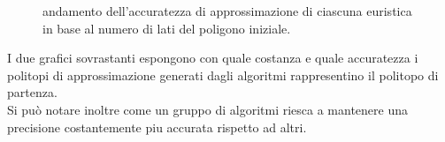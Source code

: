 \begin{figure}[H]
\begin{minipage}[b]{0.45\textwidth}
        \caption{andamento dell'accuratezza di approssimazione di ciascuna euristica in base al numero di lati del poligono iniziale.}
    \end{minipage}
\end{figure}

I due grafici sovrastanti espongono con quale costanza e quale accuratezza i politopi 
di approssimazione generati dagli algoritmi rappresentino il politopo di partenza.\\
Si può notare inoltre come un gruppo di algoritmi riesca a mantenere una
precisione costantemente piu accurata rispetto ad altri.
